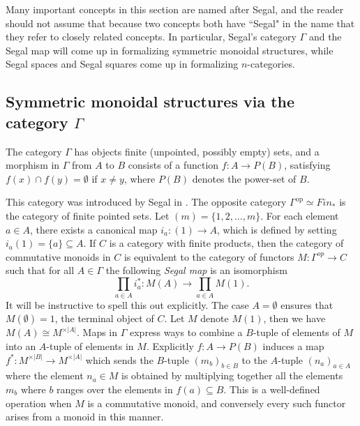 \documentclass{amsart}
\begin{document}
\begin{warning}
Many important concepts in this section are named after Segal, and the reader should not assume that because two concepts both have ``Segal" in the name that they refer to closely related concepts.  In particular, Segal's category $\Gamma$ and the Segal map will come up in formalizing symmetric monoidal structures, while Segal spaces and Segal squares come up in formalizing $n$-categories.
\end{warning}

\subsection{Symmetric monoidal structures via the category $\Gamma$}

\begin{definition}
	The category  $\Gamma$ has objects finite (unpointed, possibly empty) sets, and a morphism in $\Gamma$ from $A$ to $B$ consists of a function $f: A \to P(B)$, satisfying $f(x) \cap f(y) = \emptyset$ if $x \neq y$, where $P(B)$ denotes the power-set of $B$. 
\end{definition}

This category was introduced by Segal in \cite{segal-cct}.  The opposite category $\Gamma^\textrm{op} \simeq Fin_*$ is the category of finite pointed sets. Let $(m) = \{ 1, 2, \dots, m\}$. For each element $a \in A$, there exists a canonical map $i_a: (1) \to A$, which is defined by setting $i_a(1) = \{a\} \subseteq A$. If $C$ is a category with finite products, then the category of commutative monoids in $C$ is equivalent to the category of functors $M:\Gamma^{op} \to C$ such that for all $A\in \Gamma$ the following {\em Segal map} is an isomorphism
\begin{equation*}
	\prod_{a \in A} i_a^*: M(A) \to \prod_{a \in A} M(1).
\end{equation*}
It will be instructive to spell this out explicitly. The case $A=\emptyset$ ensures that $M(\emptyset) = 1$, the terminal object of $C$.  Let $M$ denote $M(1)$, then we have $M(A) \cong M^{\times |A|}$. Maps in $\Gamma$ express ways to combine a $B$-tuple of elements of $M$ into an $A$-tuple of elements in $M$. Explicitly $f: A \to P(B)$
induces a map $f^*: M^{\times |B|} \to M^{\times |A|}$ which sends the $B$-tuple $(m_b)_{b \in B}$ to the $A$-tuple $(n_a)_{a \in A}$ where the element $n_a \in M$ is obtained by multiplying together all the elements $m_b$ where $b$ ranges over the elements in $f(a) \subseteq B$. This is a well-defined operation when $M$ is a commutative monoid, and conversely every such functor arises from a monoid in this manner. 
\end{document}
